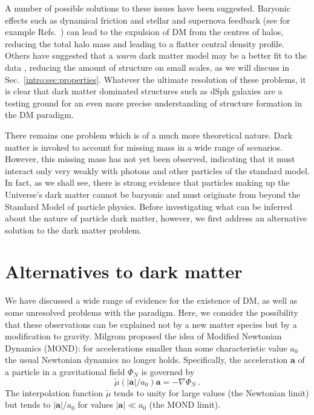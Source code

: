 A number of possible solutions to these issues have been suggested. Baryonic effects such as dynamical friction and stellar and supernova feedback (see for example Refs.~\cite{Gritschneder:2013, Amorisco:2014,DelPopolo:2014,Brooks:2014}) can lead to the expulsion of DM from the centres of halos, reducing the total halo mass and leading to a flatter central density profile. Others have suggested that a \textit{warm} dark matter model may be a better fit to the data \cite{Moore:1999, Bode:2001, Maccio:2010}, reducing the amount of structure on small scales, as we will discuss in Sec.~\ref{intro:sec:properties}. Whatever the ultimate resolution of these problems, it is clear that dark matter dominated structures such as dSph galaxies are a testing ground for an even more precise understanding of structure formation in the DM paradigm.

There remains one problem which is of a much more theoretical nature. Dark matter is invoked to account for missing mass in a wide range of scenarios. However, this missing mass has not yet been observed, indicating that it must interact only very weakly with photons and other particles of the standard model. In fact, as we shall see, there is strong evidence that particles making up the Universe's dark matter cannot be baryonic and must originate from beyond the Standard Model of particle physics.
Before investigating what can be inferred about the nature of particle dark matter, however, we first address an alternative solution to the dark matter problem.

\section{Alternatives to dark matter}

We have discussed a wide range of evidence for the existence of DM, as well as some unresolved problems with the \LCDM paradigm.
Here, we consider the possibility that these observations can be explained not by a new matter species but by a modification to gravity. Milgrom \cite{Milgrom:1983a, Milgrom:1983b, Milgrom:1983c} proposed the idea of Modified Newtonian Dynamics (MOND): for accelerations smaller than some characteristic value $a_0$ the usual Newtonian dynamics no longer holds. Specifically, the acceleration $\mathbf{a}$ of a particle in a gravitational field $\Phi_N$ is governed by
\begin{equation}
\label{eq:intro:MOND}
\tilde{\mu}(|\mathbf{a}|/a_0)\mathbf{a} = -\nabla \Phi_N\,.
\end{equation}
The interpolation function $\tilde{\mu}$ tends to unity for large values (the Newtonian limit) but tends to $|\mathbf{a}|/a_0$ for values $|\mathbf{a}| \ll a_0$ (the MOND limit).

